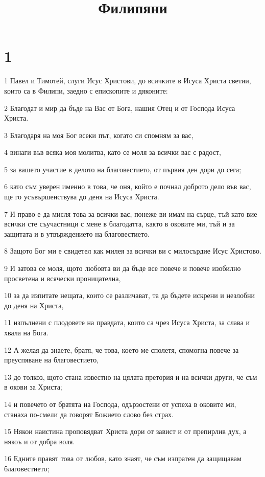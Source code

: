 

\title{Филипяни}


\chapter{1}

\par 1 Павел и Тимотей, слуги Исус Христови, до всичките в Исуса Христа светии, които са в Филипи, заедно с епископите и дяконите:
\par 2 Благодат и мир да бъде на Вас от Бога, нашия Отец и от Господа Исуса Христа.
\par 3 Благодаря на моя Бог всеки път, когато си спомням за вас,
\par 4 винаги във всяка моя молитва, като се моля за всички вас с радост,
\par 5 за вашето участие в делото на благовестието, от първия ден дори до сега;
\par 6 като съм уверен именно в това, че оня, който е почнал доброто дело във вас, ще го усъвършенствува до деня на Исуса Христа.
\par 7 И право е да мисля това за всички вас, понеже ви имам на сърце, тъй като вие всички сте съучастници с мене в благодатта, както в оковите ми, тъй и за защитата и в утвърждението на благовестието.
\par 8 Защото Бог ми е свидетел как милея за всички ви с милосърдие Исус Христово.
\par 9 И затова се моля, щото любовта ви да бъде все повече и повече изобилно просветена и всячески проницателна,
\par 10 за да изпитате нещата, които се различават, та да бъдете искрени и незлобни до деня на Христа,
\par 11 изпълнени с плодовете на правдата, които са чрез Исуса Христа, за слава и хвала на Бога.
\par 12 А желая да знаете, братя, че това, което ме сполетя, спомогна повече за преуспяване на благовестието,
\par 13 до толкоз, щото стана известно на цялата претория и на всички други, че съм в окови за Христа;
\par 14 и повечето от братята на Господа, одързостени от успеха в оковите ми, станаха по-смели да говорят Божието слово без страх.
\par 15 Някои наистина проповядват Христа дори от завист и от препирлив дух, а някоъ и от добра воля.
\par 16 Едните правят това от любов, като знаят, че съм изпратен да защищавам благовестието;
